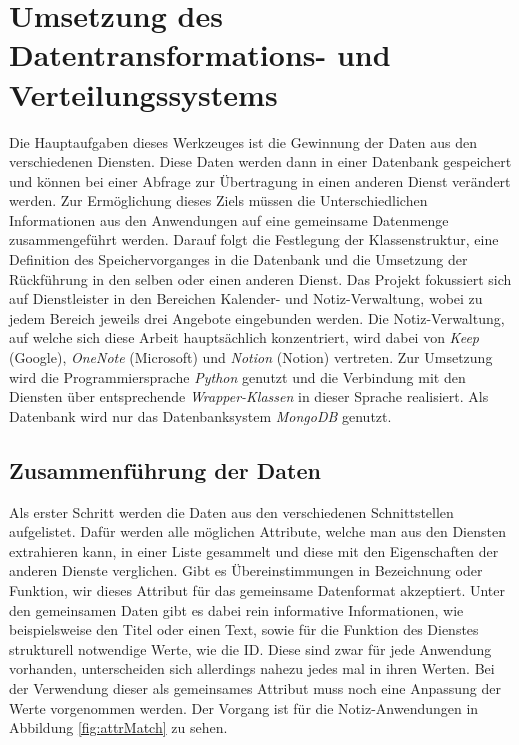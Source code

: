 \chapter{Umsetzung des Datentransformations- und Verteilungssystems}

Die Hauptaufgaben dieses Werkzeuges ist die Gewinnung der Daten aus den verschiedenen Diensten. Diese Daten werden dann in einer Datenbank gespeichert und können bei einer Abfrage zur Übertragung in einen anderen Dienst verändert werden. Zur Ermöglichung dieses Ziels müssen die Unterschiedlichen Informationen aus den Anwendungen auf eine gemeinsame Datenmenge zusammengeführt werden. Darauf folgt die Festlegung der Klassenstruktur, eine Definition des Speichervorganges in die Datenbank und die Umsetzung der Rückführung in den selben oder einen anderen Dienst. Das Projekt fokussiert sich auf Dienstleister in den Bereichen Kalender- und Notiz-Verwaltung, wobei zu jedem Bereich jeweils drei Angebote eingebunden werden. Die Notiz-Verwaltung, auf welche sich diese Arbeit hauptsächlich konzentriert, wird dabei von \textit{Keep} (Google), \textit{OneNote} (Microsoft) und \textit{Notion} (Notion) vertreten. Zur Umsetzung wird die Programmiersprache \textit{Python} genutzt und die Verbindung mit den Diensten über entsprechende \textit{Wrapper-Klassen} in dieser Sprache realisiert. Als Datenbank wird nur das Datenbanksystem \textit{MongoDB} genutzt. 

\section{Zusammenführung der Daten}

Als erster Schritt werden die Daten aus den verschiedenen Schnittstellen aufgelistet. Dafür werden alle möglichen Attribute, welche man aus den Diensten extrahieren kann, in einer Liste gesammelt und diese mit den Eigenschaften der anderen Dienste verglichen. Gibt es Übereinstimmungen in Bezeichnung oder Funktion, wir dieses Attribut für das gemeinsame Datenformat akzeptiert. Unter den gemeinsamen Daten gibt es dabei rein informative Informationen, wie beispielsweise den Titel oder einen Text, sowie für die Funktion des Dienstes strukturell notwendige Werte, wie die ID. Diese sind zwar für jede Anwendung vorhanden, unterscheiden sich allerdings nahezu jedes mal in ihren Werten. Bei der Verwendung dieser als gemeinsames Attribut muss noch eine Anpassung der Werte vorgenommen werden. Der Vorgang ist für die Notiz-Anwendungen in Abbildung \ref{fig:attrMatch} zu sehen.\\

